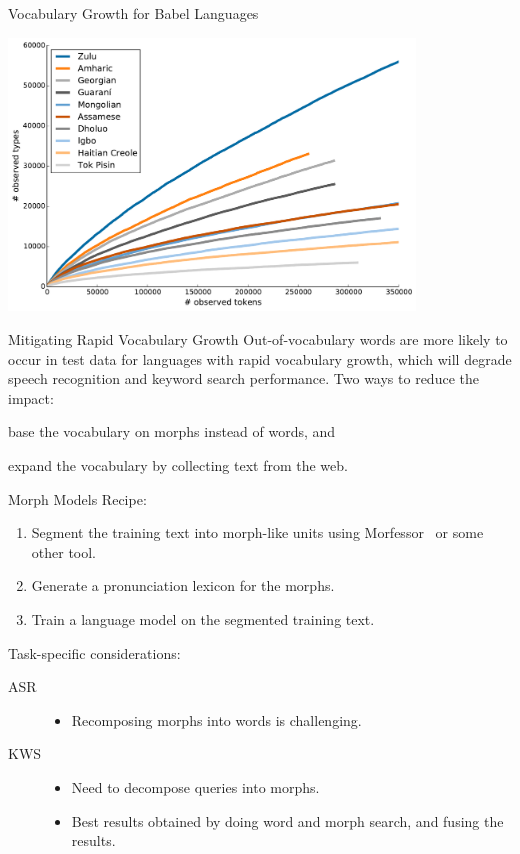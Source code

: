 \begin{frame}{Vocabulary Growth for Babel Languages}{}
  \begin{center}
    \includegraphics[width=108mm]{figures/vocGrowth}
  \end{center}
\end{frame}

\begin{frame}{Mitigating Rapid Vocabulary Growth}{}
  Out-of-vocabulary words are more likely to occur in test data for
  languages with rapid vocabulary growth, which will degrade speech
  recognition and keyword search performance.
  \vfill
  Two ways to reduce the impact:
  \begin{description}
    \item[morph models] base the vocabulary on morphs instead of
      words, and
    \item[web text] expand the vocabulary by collecting text from the
      web.
  \end{description}
\end{frame}

\begin{frame}{Morph Models}{}
  Recipe:
  \begin{enumerate}
  \item Segment the training text into morph-like units using
    Morfessor~\cite{Morfessor} or some other tool.
  \item Generate a pronunciation lexicon for the morphs.
  \item Train a language model on the segmented training text.
  \end{enumerate}
  \vfill
  Task-specific considerations:
  \begin{description}
  \item[ASR]
    \begin{itemize}
    \item Recomposing morphs into words is challenging.
    \end{itemize}
  \item[KWS]
    \begin{itemize}
      \item Need to decompose queries into morphs.
      \item Best results obtained by doing word and morph search, and
        fusing the results.
    \end{itemize}
  \end{description}
\end{frame}

